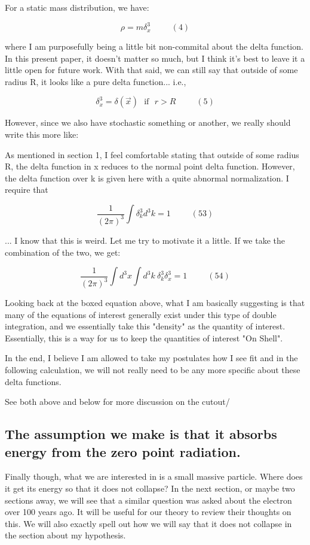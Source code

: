 \documentclass {article}
\begin{document}
For a static mass distribution, we have:

$$\rho = m \delta^3_x  ~~~~~~~~~~~ (4)$$

where I am purposefully being a little bit non-commital about the delta function. In this present paper, it doesn't matter so much, but I think it's best to leave it a little open for future work. With that said, we can still say that outside of some radius R, it looks like a pure delta function... i.e.,

$$\delta^3_x = \delta(\vec x) ~~~ \textrm{if} ~~~ r > R ~~~~~~~~~~~ (5)$$

However, since we also have stochastic something or another, we really should write this more like:

As mentioned in section 1, I feel comfortable stating that outside of some radius R, the delta function in x reduces to the normal point delta function. However, the delta function over k is given here with a quite abnormal normalization. I require that

$$\frac 1 {(2 \pi)^3} \int \delta^3_k d^3k = 1 ~~~~~~~~~~~ (53)$$

... I know that this is weird. Let me try to motivate it a little. If we take the combination of the two, we get:

$$\frac 1 {(2 \pi)^3} \int d^3x \int d^3k ~ \delta^3_k \delta^3_x = 1 ~~~~~~~~~~~ (54)$$

Looking back at the boxed equation above, what I am basically suggesting is that many of the equations of interest generally exist under this type of double integration, and we essentially take this "density" as the quantity of interest. Essentially, this is a way for us to keep the quantities of interest "On Shell".

In the end, I believe I am allowed to take my postulates how I see fit and in the following calculation, we will not really need to be any more specific about these delta functions. 

See both above and below for more discussion on the cutout/

\subsection{ The assumption we make is that it absorbs energy from the zero point radiation. }

Finally though, what we are interested in is a small massive particle. Where does it get its energy so that it does not collapse? In the next section, or maybe two sections away, we will see that a similar question was asked about the electron over 100 years ago. It will be useful for our theory to review their thoughts on this. We will also exactly spell out how we will say that it does not collapse in the section about my hypothesis.
\end{document}
